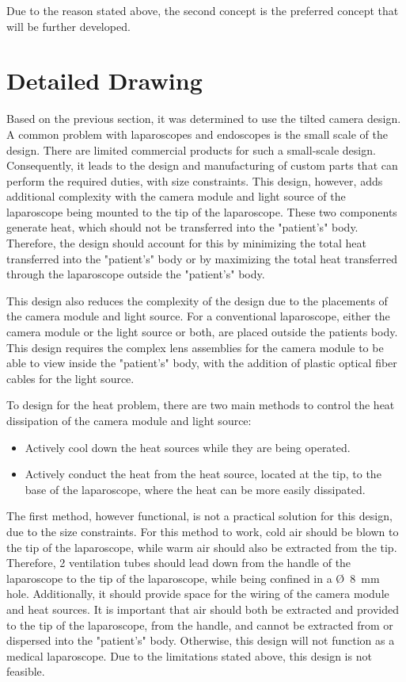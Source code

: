 Due to the reason stated above, the second concept is the preferred concept that will be further developed.

\section{Detailed Drawing}

Based on the previous section, it was determined to use the tilted camera design. A common problem with laparoscopes and endoscopes is the small scale of the design. There are limited commercial products for such a small-scale design. Consequently, it leads to the design and manufacturing of custom parts that can perform the required duties, with size constraints. This design, however, adds additional complexity with the camera module and light source of the laparoscope being mounted to the tip of the laparoscope. These two components generate heat, which should not be transferred into the "patient's" body. Therefore, the design should account for this by minimizing the total heat transferred into the "patient's" body or by maximizing the total heat transferred through the laparoscope outside the "patient's" body.

This design also reduces the complexity of the design due to the placements of the camera module and light source. For a conventional laparoscope, either the camera module or the light source or both, are placed outside the patients body. This design requires the complex lens assemblies for the camera module to be able to view inside the "patient's" body, with the addition of plastic optical fiber cables for the light source.

To design for the heat problem, there are two main methods to control the heat dissipation of the camera module and light source:

\begin{itemize}
    \item Actively cool down the heat sources while they are being operated.
    \item Actively conduct the heat from the heat source, located at the tip, to the base of the laparoscope, where the heat can be more easily dissipated.
\end{itemize}

The first method, however functional, is not a practical solution for this design, due to the size constraints. For this method to work, cold air should be blown to the tip of the laparoscope, while warm air should also be extracted from the tip. Therefore, 2 ventilation tubes should lead down from the handle of the laparoscope to the tip of the laparoscope, while being confined in a Ø~8~mm hole. Additionally, it should provide space for the wiring of the camera module and heat sources.  It is important that air should both be extracted and provided to the tip of the laparoscope, from the handle, and cannot be extracted from or dispersed into the "patient's" body. Otherwise, this design will not function as a medical laparoscope. Due to the limitations stated above, this design is not feasible.

